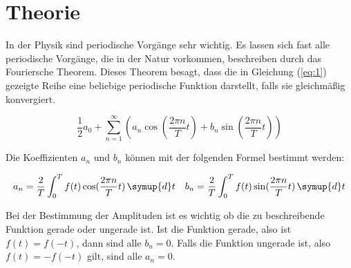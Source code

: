 \section{Theorie}

In der Physik sind periodische Vorgänge sehr wichtig. Es lassen sich fast alle
periodische Vorgänge, die in der Natur vorkommen, beschreiben durch das Fouriersche
Theorem. Dieses Theorem besagt, dass die in Gleichung (\ref{eq:1}) gezeigte Reihe eine
beliebige periodische Funktion darstellt, falls sie gleichmäßig konvergiert.

\begin{equation}
  \frac{1}{2} a_0 + \sum^{\infty}_{n=1} \left( a_n \cos(\frac{2\pi n}{T} t) + b_n \sin(\frac{2\pi n}{T}t) \right)
  \label{eq:1}
\end{equation}

Die Koeffizienten $a_n$ und $b_n$ können mit der folgenden Formel bestimmt werden:

\begin{align}
  a_n = \frac{2}{T} \int_0^T f(t) \cos(\frac{2\pi n}{T} t) \, \symup{d}t &&
  b_n = \frac{2}{T} \int_0^T f(t) \sin(\frac{2\pi n}{T} t) \, \symup{d}t
  \label{eq:2}
\end{align}

Bei der Bestimmung der Amplituden ist es wichtig ob die zu beschreibende Funktion gerade oder
ungerade ist. Ist die Funktion gerade, also ist $f(t)=f(-t)$, dann sind alle $b_n=0$.
Falls die Funktion ungerade ist, also $f(t)=-f(-t)$ gilt, sind alle $a_n=0$. 

